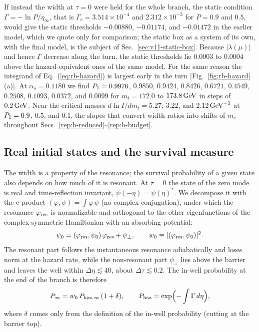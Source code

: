 If instead the width at $\tau=0$ were held for the whole branch, the static condition $\Gamma=-\ln P/\eta_\infty$, that is $\Gamma_c=3.514\times10^{-4}$ and $2.312\times10^{-3}$ for $P=0.9$ and $0.5$, would give the static thresholds $-0.00880$, $-0.01174$, and $-0.01472$ in the earlier model, which we quote only for comparison; the static box as a system of its own, with the final model, is the subject of Sec.~\ref{sec:v11-static-box}. %
Because $|\lambda(\mu)|$ and hence $\Gamma$ decrease along the turn, the static thresholds lie $0.0003$ to $0.0004$ above the hazard-equivalent ones of the same model. %
For the same reason the integrand of Eq.~(\ref{eq:rb-hazard}) is largest early in the turn [Fig.~\ref{fig:rb-hazard}(a)].
At $\alpha_s=0.1180$ we find $P_1=0.9976$, $0.9850$, $0.9424$, $0.8426$, $0.6721$, $0.4549$, $0.2508$, $0.1093$, $0.0372$, and $0.0099$ for $m_t=172.0$ to $173.8\,\mathrm{GeV}$ in steps of $0.2\,\mathrm{GeV}$. %
Near the critical masses $d\ln I/dm_t=5.27$, $3.22$, and $2.12\,\mathrm{GeV}^{-1}$ at $P_1=0.9$, $0.5$, and $0.1$, the slopes that convert width ratios into shifts of $m_c$ throughout Secs.~\ref{rep:h-reduced}--\ref{rep:h-budget}. %

\subsection{Real initial states and the survival measure}
\label{sec:rb-measure}

The width is a property of the resonance; the survival probability of a given state also depends on how much of it is resonant.
At $\tau=0$ the state of the zero mode is real and time-reflection invariant, $\psi(-\eta)=\psi(\eta)^*$.
We decompose it with the c-product $(\varphi,\psi)=\int\varphi\,\psi$ (no complex conjugation), under which the resonance $\varphi_{\rm res}$ is normalizable and orthogonal to the other eigenfunctions of the complex-symmetric Hamiltonian with an absorbing potential:
\begin{equation}
\psi_0=(\varphi_{\rm res},\psi_0)\,\varphi_{\rm res}+\psi_\perp,\qquad w_0\equiv|(\varphi_{\rm res},\psi_0)|^2 .
\label{eq:rb-decomp}
\end{equation}
The resonant part follows the instantaneous resonance adiabatically and loses norm at the hazard rate, while the non-resonant part $\psi_\perp$ lies above the barrier and leaves the well within $\Delta\eta\lesssim40$, about $\Delta\tau\lesssim0.2$. %
The in-well probability at the end of the branch is therefore
\begin{equation}
P_\infty=w_0\,P_{\rm haz,\infty}\,(1+\delta),\qquad P_{\rm haz}=\exp\Bigl(-\int\Gamma\,d\eta\Bigr),
\label{eq:rb-w0}
\end{equation}
where $\delta$ comes only from the definition of the in-well probability (cutting at the barrier top).

